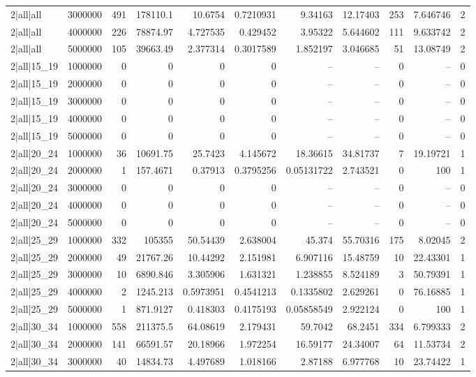 \begin{tabular}{lrrrrrrrrrr}
2|all|all & 3000000 & 491 & 178110.1 & 10.6754 & 0.7210931 & 9.34163 & 12.17403 & 253 & 7.646746 & 2 \\
2|all|all & 4000000 & 226 & 78874.97 & 4.727535 & 0.429452 & 3.95322 & 5.644602 & 111 & 9.633742 & 2 \\
2|all|all & 5000000 & 105 & 39663.49 & 2.377314 & 0.3017589 & 1.852197 & 3.046685 & 51 & 13.08749 & 2 \\
2|all|15\_19 & 1000000 & 0 & 0 & 0 & 0 & -- & -- & 0 & -- & 0 \\
2|all|15\_19 & 2000000 & 0 & 0 & 0 & 0 & -- & -- & 0 & -- & 0 \\
2|all|15\_19 & 3000000 & 0 & 0 & 0 & 0 & -- & -- & 0 & -- & 0 \\
2|all|15\_19 & 4000000 & 0 & 0 & 0 & 0 & -- & -- & 0 & -- & 0 \\
2|all|15\_19 & 5000000 & 0 & 0 & 0 & 0 & -- & -- & 0 & -- & 0 \\
2|all|20\_24 & 1000000 & 36 & 10691.75 & 25.7423 & 4.145672 & 18.36615 & 34.81737 & 7 & 19.19721 & 1 \\
2|all|20\_24 & 2000000 & 1 & 157.4671 & 0.37913 & 0.3795256 & 0.05131722 & 2.743521 & 0 & 100 & 1 \\
2|all|20\_24 & 3000000 & 0 & 0 & 0 & 0 & -- & -- & 0 & -- & 0 \\
2|all|20\_24 & 4000000 & 0 & 0 & 0 & 0 & -- & -- & 0 & -- & 0 \\
2|all|20\_24 & 5000000 & 0 & 0 & 0 & 0 & -- & -- & 0 & -- & 0 \\
2|all|25\_29 & 1000000 & 332 & 105355 & 50.54439 & 2.638004 & 45.374 & 55.70316 & 175 & 8.02045 & 2 \\
2|all|25\_29 & 2000000 & 49 & 21767.26 & 10.44292 & 2.151981 & 6.907116 & 15.48759 & 10 & 22.43301 & 1 \\
2|all|25\_29 & 3000000 & 10 & 6890.846 & 3.305906 & 1.631321 & 1.238855 & 8.524189 & 3 & 50.79391 & 1 \\
2|all|25\_29 & 4000000 & 2 & 1245.213 & 0.5973951 & 0.4541213 & 0.1335802 & 2.629261 & 0 & 76.16885 & 1 \\
2|all|25\_29 & 5000000 & 1 & 871.9127 & 0.418303 & 0.4175193 & 0.05858549 & 2.922124 & 0 & 100 & 1 \\
2|all|30\_34 & 1000000 & 558 & 211375.5 & 64.08619 & 2.179431 & 59.7042 & 68.2451 & 334 & 6.799333 & 2 \\
2|all|30\_34 & 2000000 & 141 & 66591.57 & 20.18966 & 1.972254 & 16.59177 & 24.34007 & 64 & 11.53734 & 2 \\
2|all|30\_34 & 3000000 & 40 & 14834.73 & 4.497689 & 1.018166 & 2.87188 & 6.977768 & 10 & 23.74422 & 1 \\

\end{tabular}
